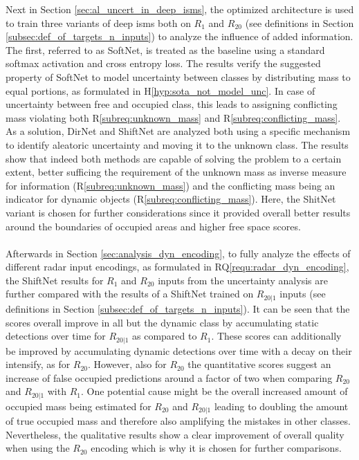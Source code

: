 Next in Section \ref{sec:al_uncert_in_deep_isms}, the optimized architecture is used to train three variants of deep \gls{ism}s both on $R_1$ and $R_{20}$ (see definitions in Section \ref{subsec:def_of_targets_n_inputs}) to analyze the influence of added information. The first, referred to as SoftNet, is treated as the baseline using a standard softmax activation and cross entropy loss. The results verify the suggested property of SoftNet to model uncertainty between classes by distributing mass to equal portions, as formulated in H\ref{hyp:sota_not_model_unc}. In case of uncertainty between free and occupied class, this leads to assigning conflicting mass violating both R\ref{subreq:unknown_mass} and R\ref{subreq:conflicting_mass}. As a solution, DirNet and ShiftNet are analyzed both using a specific mechanism to identify aleatoric uncertainty and moving it to the unknown class. The results show that indeed both methods are capable of solving the problem to a certain extent, better sufficing the requirement of the unknown mass as inverse measure for information (R\ref{subreq:unknown_mass}) and the conflicting mass being an indicator for dynamic objects (R\ref{subreq:conflicting_mass}). Here, the ShitNet variant is chosen for further considerations since it provided overall better results around the boundaries of occupied areas and higher free space scores.
\\\\
Afterwards in Section \ref{sec:analysis_dyn_encoding}, to fully analyze the effects of different radar input encodings, as formulated in RQ\ref{requ:radar_dyn_encoding}, the ShiftNet results for $R_1$ and $R_{20}$ inputs from the uncertainty analysis are further compared with the results of a ShiftNet trained on $R_{20|1}$ inputs (see definitions in Section \ref{subsec:def_of_targets_n_inputs}). It can be seen that the scores overall improve in all but the dynamic class by accumulating static detections over time for $R_{20|1}$ as compared to $R_1$. These scores can additionally be improved by accumulating dynamic detections over time with a decay on their intensify, as for $R_{20}$. However, also for $R_{20}$ the quantitative scores suggest an increase of false occupied predictions around a factor of two when comparing $R_{20}$ and $R_{20|1}$ with $R_1$. One potential cause might be the overall increased amount of occupied mass being estimated for $R_{20}$ and $R_{20|1}$ leading to doubling the amount of true occupied mass and therefore also amplifying the mistakes in other classes. Nevertheless, the qualitative results show a clear improvement of overall quality when using the $R_{20}$ encoding which is why it is chosen for further comparisons.
